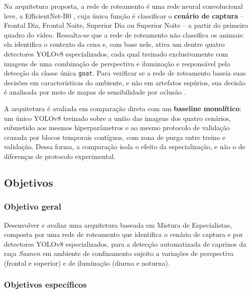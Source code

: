 \documentclass[12pt]{article}
\begin{document}
Na arquitetura proposta, a rede de roteamento é uma rede neural convolucional leve, a EfficientNet-B0 \cite{tan2019efficientnet}, cuja única função é classificar o \textbf{cenário de captura} -- Frontal Dia, Frontal Noite, Superior Dia ou Superior Noite -- a partir do primeiro quadro do vídeo. Ressalta-se que a rede de roteamento não classifica os animais: ela identifica o contexto da cena e, com base nele, ativa um dentre quatro detectores YOLOv8 \cite{jocher2023yolov8} especializados, cada qual treinado exclusivamente com imagens de uma combinação de perspectiva e iluminação e responsável pela detecção da classe única \texttt{goat}. Para verificar se a rede de roteamento baseia suas decisões em características do ambiente, e não em artefatos espúrios, sua decisão é analisada por meio de mapas de sensibilidade por oclusão \cite{zeiler2014visualizing}.

A arquitetura é avaliada em comparação direta com um \textbf{baseline monolítico}: um único YOLOv8 treinado sobre a união das imagens dos quatro cenários, submetido aos mesmos hiperparâmetros e ao mesmo protocolo de validação cruzada por blocos temporais contíguos, com zona de purga entre treino e validação. Dessa forma, a comparação isola o efeito da especialização, e não o de diferenças de protocolo experimental.

\subsection{Objetivos}
\label{subsec:objetivos}

\subsubsection*{Objetivo geral}

Desenvolver e avaliar uma arquitetura baseada em Mistura de Especialistas, composta por uma rede de roteamento que identifica o cenário de captura e por detectores YOLOv8 especializados, para a detecção automatizada de caprinos da raça \textit{Saanen} em ambiente de confinamento sujeito a variações de perspectiva (frontal e superior) e de iluminação (diurna e noturna).

\subsubsection*{Objetivos específicos}
\end{document}

